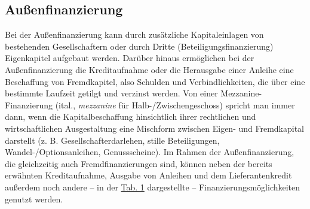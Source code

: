 \documentclass[
  letterpaper,
]{book}
\begin{document}
\subsection{Außenfinanzierung}\label{aussenfinanzierung}

Bei der Außenfinanzierung kann durch zusätzliche Kapitaleinlagen von
bestehenden Gesellschaftern oder durch Dritte (Beteiligungsfinanzierung)
Eigenkapitel aufgebaut werden. Darüber hinaus ermöglichen bei der
Außenfinanzierung die Kreditaufnahme oder die Herausgabe einer Anleihe
eine Beschaffung von Fremdkapitel, also Schulden und Verbindlichkeiten,
die über eine bestimmte Laufzeit getilgt und verzinst werden. Von einer
Mezzanine-Finanzierung (ital., \emph{mezzanine} für
Halb-/Zwischengeschoss) spricht man immer dann, wenn die
Kapitalbeschaffung hinsichtlich ihrer rechtlichen und wirtschaftlichen
Ausgestaltung eine Mischform zwischen Eigen- und Fremdkapital darstellt
(z. B. Gesellschafterdarlehen, stille Beteiligungen,
Wandel-/Optionsanleihen, Genussscheine). Im Rahmen der
Außenfinanzierung, die gleichzeitig auch Fremdfinanzierungen sind,
können neben der bereits erwähnten Kreditaufnahme, Ausgabe von Anleihen
und dem Lieferantenkredit außerdem noch andere -- in der
\hyperref[table51]{Tab. 1} dargestellte -- Finanzierungsmöglichkeiten
genutzt werden.
\end{document}
